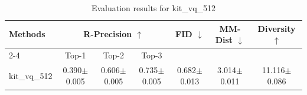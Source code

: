 \begin{table}[h]
\centering
\begin{tabular}{l ccc ccc}
\toprule
\multirow{2}{*}{\textbf{Methods}} & \multicolumn{3}{c}{\textbf{R-Precision $\uparrow$}} & \multirow{2}{*}{\textbf{FID $\downarrow$}} & \multirow{2}{*}{\textbf{MM-Dist $\downarrow$}} & \multirow{2}{*}{\textbf{Diversity $\uparrow$}} \\
\cmidrule(lr){2-4}
& Top-1 & Top-2 & Top-3 & & & \\
\midrule
kit_vq_512 & 0.390$\pm$0.005 & 0.606$\pm$0.005 & 0.735$\pm$0.005 & 0.682$\pm$0.013 & 3.014$\pm$0.011 & 11.116$\pm$0.086 \\
\bottomrule
\end{tabular}
\caption{Evaluation results for kit_vq_512}
\label{tab:results_kit_vq_512}
\end{table}
